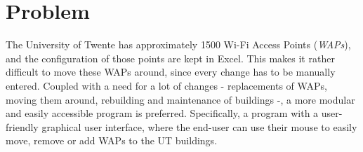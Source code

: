 \section{Problem}
The University of Twente has approximately 1500 Wi-Fi Access Points (\emph{WAPs}), and the configuration of those points are kept in Excel. This makes it rather difficult to move these WAPs around, since every change has to be manually entered. Coupled with a need for a lot of changes - replacements of WAPs, moving them around, rebuilding and maintenance of buildings -, a more modular and easily accessible program is preferred. Specifically, a program with a user-friendly graphical user interface, where the end-user can use their mouse to easily move, remove or add WAPs to the UT buildings.
